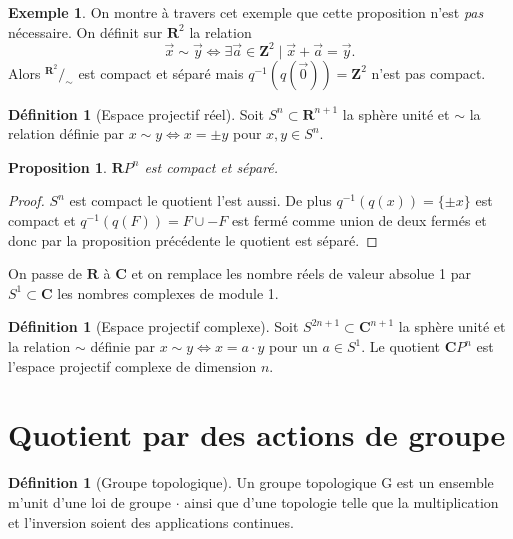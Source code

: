 \documentclass[12pt]{book}
\newtheorem{prop}[lemma]{Proposition}
\theoremstyle{definition}
\newtheorem{definition}[lemma]{Définition}
\newtheorem{example}[lemma]{Exemple}
\theoremstyle{remark}
\newcommand*\quot[2]{{^{\textstyle #1}\big/_{\textstyle #2}}}
\begin{document}
	\begin{example} On montre à travers cet exemple que cette proposition n'est \emph{pas} nécessaire. On définit sur $\mathbf{R}^2$ la relation  \[
		\overrightarrow{x} \sim \overrightarrow{y} \iff \exists \overrightarrow{a} \in \mathbf{Z}^2 \;|\; \overrightarrow{x} + \overrightarrow{a} = \overrightarrow{y}
	.\] Alors $\quot{\mathbf{R}^2}{\sim}$ est compact et séparé mais $q^{-1}(q(\overrightarrow{0})) = \mathbf{Z}^2$ n'est pas compact.
	\end{example}

	\begin{definition}[Espace projectif réel]
		Soit $S^n \subset \mathbf{R}^{n+1}$ la sphère unité et $\sim$ la relation définie par $x \sim y \iff x = \pm y$ pour $x,y \in S^n$.
	\end{definition}
	\begin{prop}
		$\mathbf{R}P^n$ est compact et séparé.
	\end{prop}
	\begin{proof}
		$S^n$ est compact le quotient l'est aussi. De plus $q^{-1}(q(x)) = \{\pm x\}$ est compact et $q^{-1}(q(F)) = F \cup -F$ est fermé comme union de deux fermés et donc par la proposition précédente le quotient est séparé.
	\end{proof}
	On passe de $\mathbf{R}$ à  $\mathbf{C}$ et on remplace les nombre réels de valeur absolue 1 par  $S^1 \subset \mathbf{C}$ les nombres complexes de module 1.

	\begin{definition}[Espace projectif complexe]
		Soit $S^{2n+1} \subset \mathbf{C}^{n+1}$ la sphère unité et la relation $\sim$ définie par  $x \sim y  \iff x = a\cdot y$ pour un $a \in S^1$. Le quotient $\mathbf{C}P^n$ est l'espace projectif complexe de dimension  $n$.
	\end{definition}

	\section{Quotient par des actions de groupe}

	\begin{definition}[Groupe topologique]
		Un groupe topologique G est un ensemble m'unit d'une loi de groupe $\cdot$ ainsi que d'une topologie telle que la multiplication et l'inversion soient des applications continues. 
	\end{definition}
\end{document}
